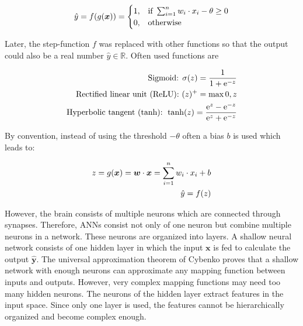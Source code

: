 \begin{equation}\eqlbl{Perceptron}
		\hat{y} =f(g(\boldsymbol{x})) = \begin{cases}
      		1, & \text{if}\ \sum_{i=1}^{n}w_i \cdot x_i - \theta \geq 0 \\
      		0, & \text{otherwise}
    	\end{cases}
\end{equation}

Later, the step-function \(f\) was replaced with other functions so that the output could also be a real number \(\hat{y} \in \mathbb{R}\). Often used functions are

\begin{equation}\eqlbl{act_functions}
	\begin{aligned}
		\text{Sigmoid: } \sigma(z) = \frac{1}{1+\mathrm{e}^{-z}}\\
		\text{Rectified linear unit (ReLU): } (z)^{+} = \max{0, z}\\
		\text{Hyperbolic tangent (tanh): } \tanh(z) = \frac{\mathrm{e}^{z}-\mathrm{e}^{-z}}{\mathrm{e}^{z}+\mathrm{e}^{-z}}
	\end{aligned}
\end{equation}

By convention, instead of using the threshold \(- \theta\) often a bias \(b\) is used which leads to:

\begin{equation}\eqlbl{nn}
	\begin{aligned}
		z = g(\boldsymbol{x}) = \boldsymbol{w} \cdot \boldsymbol{x} = \sum_{i=1}^{n}w_i \cdot x_i + b\\
		\hat{y} = f(z)
	\end{aligned}
\end{equation}

However, the brain consists of multiple neurons which are connected through synapses.
Therefore, ANNs consist not only of one neuron but combine multiple neurons in a network. 
These neurons are organized into layers.
A shallow neural network consists of one hidden layer in which the input \(\boldsymbol{x}\) is fed to calculate the output \(\boldsymbol{\hat{y}}\).
The universal approximation theorem of Cybenko  proves that a shallow network with enough neurons can approximate any mapping function between inputs and outputs.
However, very complex mapping functions may need too many hidden neurons.
The neurons of the hidden layer extract features in the input space.
Since only one layer is used, the features cannot be hierarchically organized and become complex enough.

